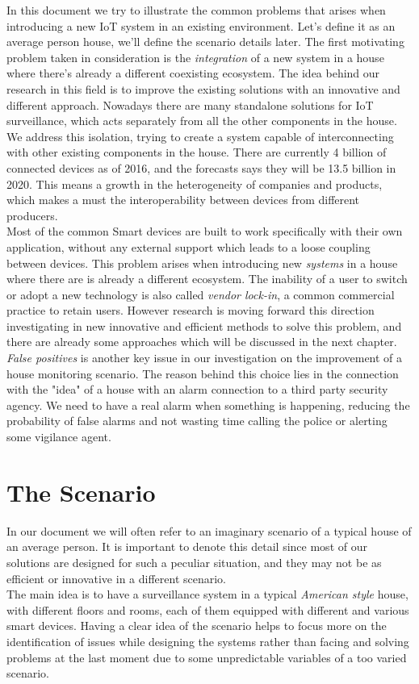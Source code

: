 In this document we try to illustrate the common problems that arises
when introducing a new IoT system in an existing environment. Let's define it as
an average person house, we'll define the scenario details later.
The first motivating problem taken in consideration is the \textit{integration} of a new
system in a house where there's already a different coexisting ecosystem.
The idea behind our research in this field is to improve the existing solutions
with an innovative and different approach. Nowadays there are many standalone
solutions for IoT surveillance, which acts separately from all the other
components in the house. We address this isolation, trying to create
a system capable of interconnecting with other existing components in the house.
There are currently 4 billion of connected devices \cite{gartner} as of 2016, and the forecasts
says they will be 13.5 billion in 2020. This means a growth in the heterogeneity of companies
and products, which makes a must the interoperability between devices from different
producers.\\
Most of the common Smart devices are built to work specifically with their own application,
without any external support which leads to a loose coupling between devices. This problem
arises when introducing new \textit{systems} in a house where there are is already a different
ecosystem. The inability of a user to switch or adopt a new technology is also called \textit{vendor lock-in},
a common commercial practice to retain users. However research is moving forward
this direction investigating in new innovative and efficient methods to solve this
problem, and there are already some approaches which will be discussed in the next chapter.
\textit{False positives} is another key issue in our investigation on the improvement of a
house monitoring scenario. The reason behind this choice lies in the connection with the "idea"
of a house with an alarm connection to a third party security agency. We need to have a real
alarm when something is happening, reducing the probability of false alarms and not wasting time
calling the police or alerting some vigilance agent.


\section{The Scenario}

In our document we will often refer to an imaginary scenario of a typical house
of an average person. It is important to denote this detail since most of our
solutions are designed for such a peculiar situation, and they may not be as
efficient or innovative in a different scenario.\\
The main idea is to have a surveillance system in a typical \textit{American style}
house, with different floors and rooms, each of them equipped with different
and various smart devices. Having a clear idea of the scenario helps to focus more
on the identification of issues while designing the systems rather than facing
and solving problems at the last moment due to some unpredictable variables of a
too varied scenario.

